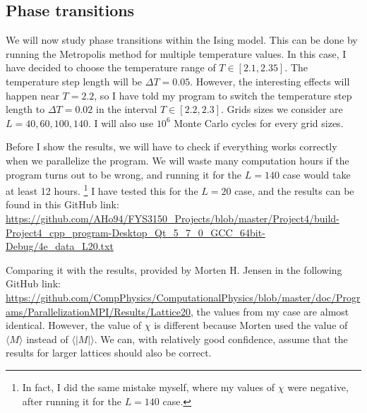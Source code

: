 \documentclass[12pt]{article}
\begin{document}
\subsection{Phase transitions}
We will now study phase transitions within the Ising model. This can be done by running the Metropolis method for multiple temperature values. In this case, I have decided to choose the temperature range of $T\in [2.1, 2.35]$. The temperature step length will be $\Delta T = 0.05$. However, the interesting effects will happen near $T=2.2$, so I have told my program to switch the temperature step length to $\Delta T = 0.02$ in the interval $T\in[2.2,2.3]$. Grids sizes we consider are $L=40,60,100,140$. I will also use $10^6$ Monte Carlo cycles for every grid sizes.

Before I show the results, we will have to check if everything works correctly when we parallelize the program. We will waste many computation hours if the program turns out to be wrong, and running it for the $L=140$ case would take at least 12 hours. \footnote{In fact, I did the same mistake myself, where my values of $\chi$ were negative, after running it for the $L=140$ case.} I have tested this for the $L=20$ case, and the results can be found in this GitHub link:
 \url{https://github.com/AHo94/FYS3150_Projects/blob/master/Project4/build-Project4_cpp_program-Desktop_Qt_5_7_0_GCC_64bit-Debug/4e_data_L20.txt}

Comparing it with the results, provided by Morten H. Jensen in the following GitHub link: 
\url{https://github.com/CompPhysics/ComputationalPhysics/blob/master/doc/Programs/ParallelizationMPI/Results/Lattice20}, the values from my case are almost identical. However, the value of $\chi$ is different because Morten used the value of $\langle M \rangle$ instead of $\langle |M| \rangle$. We can, with relatively good confidence, assume that the results for larger lattices should also be correct.
\end{document}
